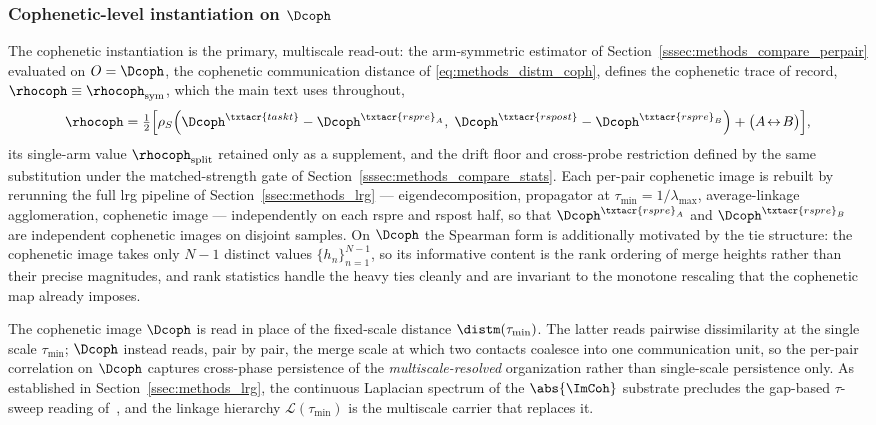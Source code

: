 \subsubsection{Cophenetic-level instantiation on \texorpdfstring{\(\Dcoph\)}{D coph}}
    \label{sssec:methods_compare_ctm}
%
The cophenetic instantiation is the primary, multiscale read-out: the arm-symmetric estimator of Section~\ref{sssec:methods_compare_perpair} evaluated on \(O = \Dcoph\), the cophenetic communication distance of \eqref{eq:methods_distm_coph}, defines the cophenetic trace of record, \(\rhocoph \equiv \rhocoph_{\mathrm{sym}}\), which the main text uses throughout,
\begin{equation}
    \rhocoph = \tfrac{1}{2}\Big[\rho_{S}\!\left(\Dcoph^{\txtacr{taskt}} - \Dcoph^{\txtacr{rspre}_{A}},\; \Dcoph^{\txtacr{rspost}} - \Dcoph^{\txtacr{rspre}_{B}}\right) + \big(A\!\leftrightarrow\!B\big)\Big],
    \label{eq:methods_rho_coph}
\end{equation}
its single-arm value \(\rhocoph_{\mathrm{split}}\) retained only as a supplement, and the drift floor and cross-probe restriction defined by the same substitution under the matched-strength gate of Section~\ref{sssec:methods_compare_stats}. Each per-pair cophenetic image is rebuilt by rerunning the full \gls{lrg} pipeline of Section~\ref{ssec:methods_lrg} --- eigendecomposition, propagator at \(\tau_{\min} = 1/\lambda_{\max}\), average-linkage agglomeration, cophenetic image --- independently on each \acrshort{rspre} and \acrshort{rspost} half, so that \(\Dcoph^{\txtacr{rspre}_{A}}\) and \(\Dcoph^{\txtacr{rspre}_{B}}\) are independent cophenetic images on disjoint samples. On \(\Dcoph\) the Spearman form is additionally motivated by the tie structure: the cophenetic image takes only \(N-1\) distinct values \(\{h_{n}\}_{n=1}^{N-1}\), so its informative content is the rank ordering of merge heights rather than their precise magnitudes, and rank statistics handle the heavy ties cleanly and are invariant to the monotone rescaling that the cophenetic map already imposes.

The cophenetic image \(\Dcoph\) is read in place of the fixed-scale distance \(\distm(\tau_{\min})\). The latter reads pairwise dissimilarity at the single scale \(\tau_{\min}\); \(\Dcoph\) instead reads, pair by pair, the merge scale at which two contacts coalesce into one communication unit, so the per-pair correlation on \(\Dcoph\) captures cross-phase persistence of the \emph{multiscale-resolved} organization rather than single-scale persistence only. As established in Section~\ref{ssec:methods_lrg}, the continuous Laplacian spectrum of the \(\abs{\ImCoh}\) substrate precludes the gap-based \(\tau\)-sweep reading of~\cite{villegas2025multiscale}, and the linkage hierarchy \(\mathcal{L}(\tau_{\min})\) is the multiscale carrier that replaces it.
%
